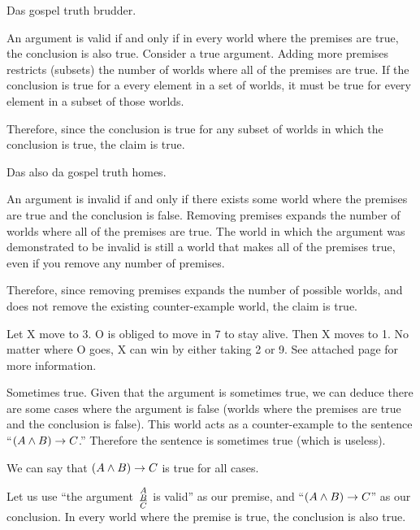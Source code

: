 \item Das gospel truth brudder.

An argument is valid if and only if in every world where the premises are true, the conclusion is also true. Consider a true argument. Adding more premises restricts (subsets) the number of worlds where all of the premises are true. If the conclusion is true for a every element in a set of worlds, it must be true for every element in a subset of those worlds.

Therefore, since the conclusion is true for any subset of worlds in which the conclusion is true, the claim is true.

\item Das also da gospel truth homes.

An argument is invalid if and only if there exists some world where the premises are true and the conclusion is false. Removing premises expands the number of worlds where all of the premises are true. The world in which the argument was demonstrated to be invalid is still a world that makes all of the premises true, even if you remove any number of premises.

Therefore, since removing premises expands the number of possible worlds, and does not remove the existing counter-example world, the claim is true.

\item Let X move to 3. O is obliged to move in 7 to stay alive. Then X moves to 1. No matter where O goes, X can win by either taking 2 or 9. See attached page for more information.

\item Sometimes true. Given that the argument is sometimes true, we can deduce there are some cases where the argument is false (worlds where the premises are true and the conclusion is false). This world acts as a counter-example to the sentence ``\( (A \land B) \rightarrow C \).'' Therefore the sentence is sometimes true (which is useless).

\item We can say that \( (A \land B) \rightarrow C \) is true for all cases.

Let us use ``the argument \(
\begin{smallmatrix}
A \\ B \\ \hline \\ C
\end{smallmatrix}
\) is valid'' as our premise, and ``\((A \land B) \rightarrow C\)'' as our conclusion. In every world where the premise is true, the conclusion is also true.

